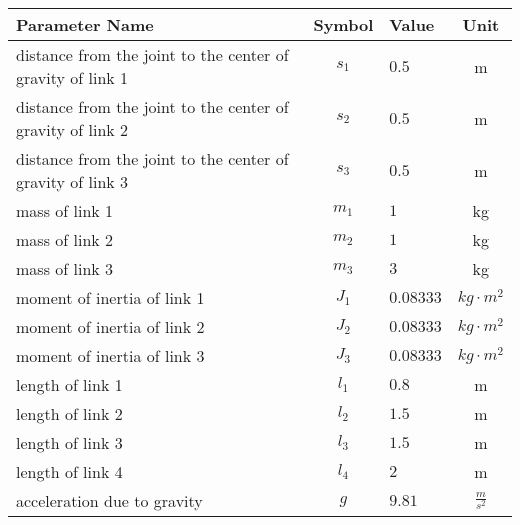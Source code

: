 \begin{tabular}{lclc}
\hline
 Parameter Name                                             &  Symbol  & Value     &      Unit       \\
\hline
 distance from the joint to the center of gravity of link 1 & $s_{1}$  & $0.5$     &        m        \\
 distance from the joint to the center of gravity of link 2 & $s_{2}$  & $0.5$     &        m        \\
 distance from the joint to the center of gravity of link 3 & $s_{3}$  & $0.5$     &        m        \\
 mass of link 1                                             & $m_{1}$  & $1$       &       kg        \\
 mass of link 2                                             & $m_{2}$  & $1$       &       kg        \\
 mass of link 3                                             & $m_{3}$  & $3$       &       kg        \\
 moment of inertia of link 1                                & $J_{1}$  & $0.08333$ & $kg \cdot m^2$  \\
 moment of inertia of link 2                                & $J_{2}$  & $0.08333$ & $kg \cdot m^2$  \\
 moment of inertia of link 3                                & $J_{3}$  & $0.08333$ & $kg \cdot m^2$  \\
 length of link 1                                           & $l_{1}$  & $0.8$     &        m        \\
 length of link 2                                           & $l_{2}$  & $1.5$     &        m        \\
 length of link 3                                           & $l_{3}$  & $1.5$     &        m        \\
 length of link 4                                           & $l_{4}$  & $2$       &        m        \\
 acceleration due to gravity                                &   $g$    & $9.81$    & $\frac{m}{s^2}$ \\
\hline
\end{tabular}